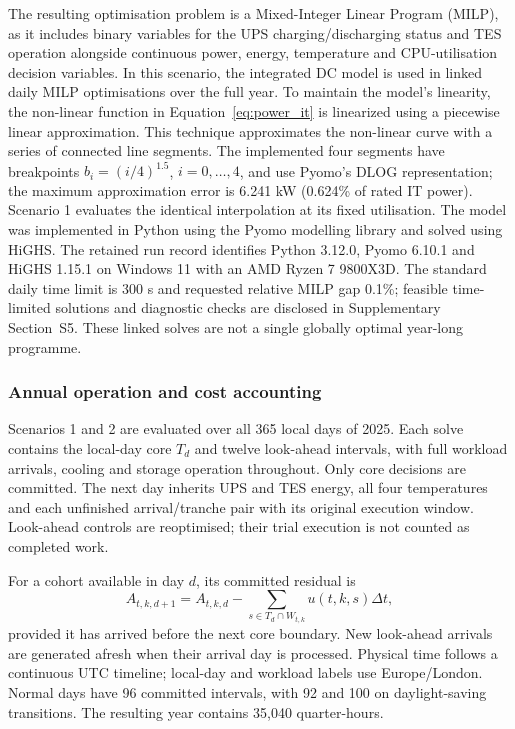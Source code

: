 \documentclass[lettersize,journal]{IEEEtran}
\newcommand{\rev}[1]{#1}
\begin{document}
\rev{The resulting optimisation problem is a Mixed-Integer Linear Program (MILP), as it includes binary variables for the UPS charging/discharging status and TES operation alongside continuous power, energy, temperature and CPU-utilisation decision variables.} In this scenario, the integrated DC model is used in linked daily MILP optimisations over the full year. To maintain the model's linearity, the non-linear function in Equation~\ref{eq:power_it} is linearized using a piecewise linear approximation. This technique approximates the non-linear curve with a series of connected line segments. The implemented four segments have breakpoints $b_i=(i/4)^{1.5}$, $i=0,\ldots,4$, and use Pyomo's DLOG representation; the maximum approximation error is 6.241 kW (0.624\% of rated IT power). Scenario 1 evaluates the identical interpolation at its fixed utilisation. The model was implemented in Python using the Pyomo modelling library and solved using HiGHS. The retained run record identifies Python 3.12.0, Pyomo 6.10.1 and HiGHS 1.15.1 on Windows 11 with an AMD Ryzen 7 9800X3D. The standard daily time limit is 300 s and requested relative MILP gap 0.1\%; feasible time-limited solutions and diagnostic checks are disclosed in Supplementary Section~S5. These linked solves are not a single globally optimal year-long programme.



\subsubsection{Annual operation and cost accounting}\label{sec:annual-operation}
Scenarios 1 and 2 are evaluated over all 365 local days of 2025. Each solve contains the local-day core $T_d$ and twelve look-ahead intervals, with full workload arrivals, cooling and storage operation throughout. Only core decisions are committed. The next day inherits UPS and TES energy, all four temperatures and each unfinished arrival/tranche pair with its original execution window. Look-ahead controls are reoptimised; their trial execution is not counted as completed work.

For a cohort available in day $d$, its committed residual is
\begin{equation}
A_{t,k,d+1}=A_{t,k,d}-\sum_{s\in T_d\cap W_{t,k}}u(t,k,s)\Delta t,
\label{eq:cohort-handoff}
\end{equation}
provided it has arrived before the next core boundary. New look-ahead arrivals are generated afresh when their arrival day is processed. Physical time follows a continuous UTC timeline; local-day and workload labels use Europe/London. Normal days have 96 committed intervals, with 92 and 100 on daylight-saving transitions. The resulting year contains 35,040 quarter-hours.
\end{document}
